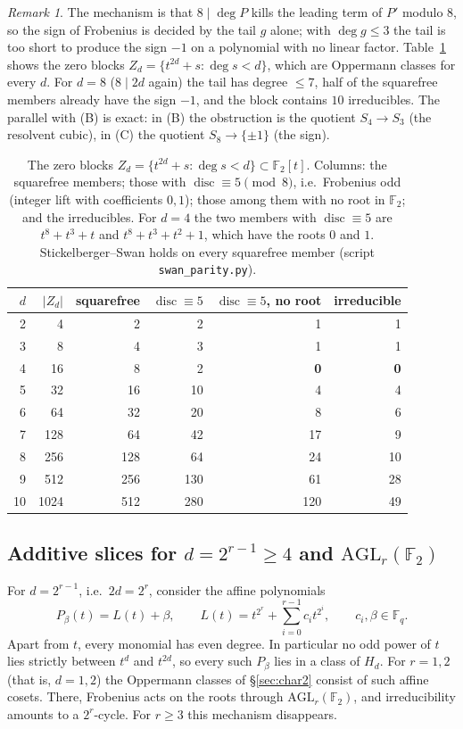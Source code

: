\documentclass[11pt,a4paper]{amsart}
\theoremstyle{definition}
\theoremstyle{remark}
\newtheorem{remark}[theorem]{Remark}
\newcommand{\F}{\mathbb{F}}
\newcommand{\disc}{\operatorname{disc}}
\newcommand{\AGL}{\mathrm{AGL}}
\begin{document}
\begin{remark}
The mechanism is that $8\mid\deg P$ kills the leading term of $P'$ modulo $8$, so the sign of Frobenius is decided by
the tail $g$ alone; with $\deg g\le3$ the tail is too short to produce the sign $-1$ on a polynomial with no linear
factor. Table~\ref{tab:zero} shows the zero blocks $Z_d=\{t^{2d}+s:\deg s<d\}$, which are Oppermann classes for every
$d$. For $d=8$ ($8\mid 2d$ again) the tail has degree $\le7$, half of the squarefree members already have the sign
$-1$, and the block contains $10$ irreducibles. The parallel with (B) is exact: in (B) the obstruction is the
quotient $S_4\to S_3$ (the resolvent cubic), in (C) the quotient $S_8\to\{\pm1\}$ (the sign).
\end{remark}

\begin{table}[!htbp]
\centering
\caption{The zero blocks $Z_d=\{t^{2d}+s:\deg s<d\}\subset\F_2[t]$. Columns: the squarefree members; those with
$\disc\equiv5\pmod8$, i.e.\ Frobenius odd (integer lift with coefficients $0,1$); those among them with no root in
$\F_2$; and the irreducibles. For $d=4$ the two members with $\disc\equiv5$ are $t^8+t^3+t$ and $t^8+t^3+t^2+1$,
which have the roots $0$ and $1$. Stickelberger--Swan holds on every squarefree member (script
\texttt{swan\_parity.py}).}\label{tab:zero}
\begin{tabular}{rrrrrr}
\toprule
$d$ & $|Z_d|$ & squarefree & $\disc\equiv5$ & $\disc\equiv5$, no root & irreducible\\
\midrule
2 & 4 & 2 & 2 & 1 & 1\\
3 & 8 & 4 & 3 & 1 & 1\\
4 & 16 & 8 & 2 & \textbf{0} & \textbf{0}\\
5 & 32 & 16 & 10 & 4 & 4\\
6 & 64 & 32 & 20 & 8 & 6\\
7 & 128 & 64 & 42 & 17 & 9\\
8 & 256 & 128 & 64 & 24 & 10\\
9 & 512 & 256 & 130 & 61 & 28\\
10 & 1024 & 512 & 280 & 120 & 49\\
\bottomrule
\end{tabular}
\end{table}


\subsection{\texorpdfstring{Additive slices for $d=2^{r-1}\ge4$ and $\AGL_r(\F_2)$}{Additive slices for d at least 4 and AGL(r,2)}}\label{subsec:additive}
For $d=2^{r-1}$, i.e.\ $2d=2^r$, consider the affine polynomials
\[
P_\beta(t)=L(t)+\beta,\qquad L(t)=t^{2^r}+\sum_{i=0}^{r-1}c_it^{2^i},\qquad c_i,\beta\in\F_q .
\]
Apart from $t$, every monomial has even degree. In particular no odd power of $t$ lies strictly between $t^d$ and
$t^{2d}$, so every such $P_\beta$ lies in a class of $H_d$. For $r=1,2$ (that is, $d=1,2$) the Oppermann classes of
\S\ref{sec:char2} consist of such affine cosets. There, Frobenius acts on the roots through $\mathrm{AGL}_r(\F_2)$, and
irreducibility amounts to a $2^r$-cycle. For $r\ge3$ this mechanism disappears.
\end{document}
